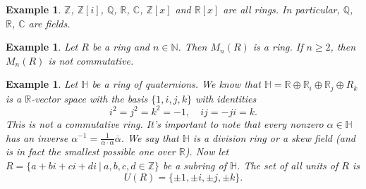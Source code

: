\documentclass[10pt, a4paper]{article}
\newtheorem{example}[thm]{Example}
\newcommand{\N}{\mathbb {N}}
\newcommand{\Z}{\mathbb {Z}}
\newcommand{\Q}{\mathbb {Q}}
\newcommand{\R}{\mathbb {R}}
\newcommand{\C}{\mathbb {C}}
\newcommand{\Ha}{\mathbb {H}}
\begin{document}
\begin{example}
        $\Z$, $\Z[i]$, $\Q$, $\R$, $\C$, $\Z[x]$ and $\R[x]$ are all rings.
        In particular, $\Q$, $\R$, $\C$ are fields.
\end{example}

\begin{example}
    Let $R$ be a ring and $n \in \N$. Then $M_n (R)$ is a ring. If $n \geq 2$, then $M_n (R)$ is not commutative.
\end{example}

\begin{example}
        Let $\Ha$ be a ring of quaternions. We know that $\Ha = \R \oplus \R_i \oplus \R_j \oplus R_k$
        is a $\R$-vector space with the basis $\{1, i, j, k\}$ with identities 
        $$i^2 = j^2 = k^2 = -1,\quad ij = - ji = k.$$ This is not a commutative ring.
        It's important to note that every nonzero $\alpha \in \Ha$ has an inverse $\alpha^{-1} = \frac{1}{\alpha \cdot \overline{\alpha}} \overline{\alpha}$.
        We say that $\Ha$ is a division ring or a skew field (and is in fact the smallest possible one over $\R$).
        Now let $R = \{a + bi + ci + di\ |\ a, b, c, d \in \Z\}$ be a subring of $\Ha$.
        The set of all units of $R$ is $$U(R) = \{\pm 1, \pm i, \pm j, \pm k\}.$$
\end{example}
\end{document}

